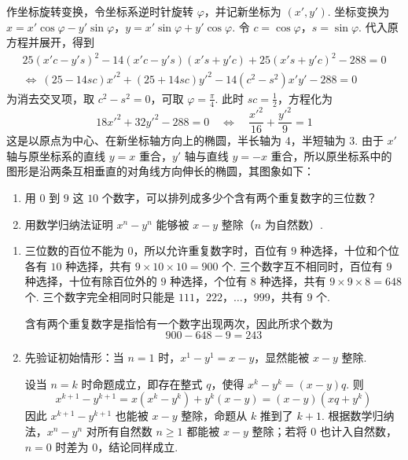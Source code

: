 \begin{solution}
作坐标旋转变换，令坐标系逆时针旋转 \(\varphi\)，并记新坐标为 \((x',y')\). 坐标变换为
\(x=x'\cos\varphi-y'\sin\varphi\)，\(y=x'\sin\varphi+y'\cos\varphi\).
令 \(c=\cos\varphi\)，\(s=\sin\varphi\). 代入原方程并展开，得到
\[
\begin{gathered}
25(x'c-y's)^2-14(x'c-y's)(x's+y'c)+25(x's+y'c)^2-288=0 \\
\Longleftrightarrow\ (25-14sc)x'^2+(25+14sc)y'^2-14(c^2-s^2)x'y'-288=0
\end{gathered}
\]
为消去交叉项，取 \(c^2-s^2=0\)，可取 \(\varphi=\frac{\pi}{4}\). 此时 \(sc=\frac{1}{2}\)，方程化为
\[
18x'^2+32y'^2-288=0
\quad\Longleftrightarrow\quad
\frac{x'^2}{16}+\frac{y'^2}{9}=1
\]
这是以原点为中心、在新坐标轴方向上的椭圆，半长轴为 \(4\)，半短轴为 \(3\). 由于 \(x'\) 轴与原坐标系的直线 \(y=x\) 重合，\(y'\) 轴与直线 \(y=-x\) 重合，所以原坐标系中的图形是沿两条互相垂直的对角线方向伸长的椭圆，其图象如下：

\end{solution}

\begin{problem}

\begin{enumerate}
    \item 用 \(0\) 到 \(9\) 这 \(10\) 个数字，可以排列成多少个含有两个重复数字的三位数？
    \item 用数学归纳法证明 \(x^n-y^n\) 能够被 \(x-y\) 整除（\(n\) 为自然数）.
\end{enumerate}
\end{problem}

\begin{solution}
\begin{enumerate}
\item 三位数的百位不能为 \(0\)，所以允许重复数字时，百位有 \(9\) 种选择，十位和个位各有 \(10\) 种选择，共有 \(9\times10\times10=900\) 个. 三个数字互不相同时，百位有 \(9\) 种选择，十位有除百位外的 \(9\) 种选择，个位有 \(8\) 种选择，共有 \(9\times9\times8=648\) 个. 三个数字完全相同时只能是 \(111\)，\(222\)，\(\dots\)，\(999\)，共有 \(9\) 个.

含有两个重复数字是指恰有一个数字出现两次，因此所求个数为
\[
900-648-9=243
\]

\item 先验证初始情形：当 \(n=1\) 时，\(x^1-y^1=x-y\)，显然能被 \(x-y\) 整除.

设当 \(n=k\) 时命题成立，即存在整式 \(q\)，使得 \(x^k-y^k=(x-y)q\). 则
\[
x^{k+1}-y^{k+1}
=x\left(x^k-y^k\right)+y^k\left(x-y\right)
=(x-y)\left(xq+y^k\right)
\]
因此 \(x^{k+1}-y^{k+1}\) 也能被 \(x-y\) 整除，命题从 \(k\) 推到了 \(k+1\). 根据数学归纳法，\(x^n-y^n\) 对所有自然数 \(n\geqslant1\) 都能被 \(x-y\) 整除；若将 \(0\) 也计入自然数，\(n=0\) 时差为 \(0\)，结论同样成立.
\end{enumerate}
\end{solution}


